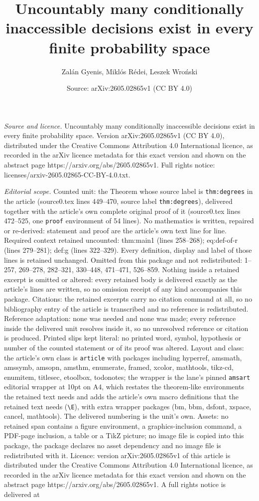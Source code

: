 \documentclass[10pt,a4paper]{amsart}
\title[Uncountably many conditionally inaccessible decisions exist ]{Uncountably many conditionally inaccessible decisions exist in every finite probability space}
\author{Zal\'an Gyenis, Mikl\'os R\'edei, Leszek Wro\'nski}
\date{Source: arXiv:2605.02865v1 (CC BY 4.0)}
\begin{document}
\maketitle

\noindent\emph{Source and licence.} Uncountably many conditionally inaccessible decisions exist in every finite probability space. Version arXiv:2605.02865v1 (CC BY 4.0), distributed under the Creative Commons Attribution 4.0 International licence, as recorded in the arXiv licence metadata for this exact version and shown on the abstract page https://arxiv.org/abs/2605.02865v1. Full rights notice: licenses/arxiv-2605.02865-CC-BY-4.0.txt.\par\smallskip

\noindent\textit{Editorial scope.} Counted unit: the Theorem whose source label is \texttt{thm:degrees} in the article (source0.tex lines 449--470, source label \texttt{thm:degrees}), delivered together with the article's own complete original proof of it (source0.tex lines 472--525, one \texttt{proof} environment of 54 lines). No mathematics is written, repaired or re-derived: statement and proof are the article's own text line for line. Required context retained uncounted: thm:main1 (lines 258--268); eq:def-of-r (lines 279--281); def:g (lines 322--329). Every definition, display and label of those lines is retained unchanged. Omitted from this package and not redistributed: 1--257, 269--278, 282--321, 330--448, 471--471, 526--859. Nothing inside a retained excerpt is omitted or altered: every retained body is delivered exactly as the article's lines are written, so no omission receipt of any kind accompanies this package. Citations: the retained excerpts carry no citation command at all, so no bibliography entry of the article is transcribed and no reference is redistributed. Reference adaptation: none was needed and none was made; every reference inside the delivered unit resolves inside it, so no unresolved reference or citation is produced. Printed slips kept literal: no printed word, symbol, hypothesis or number of the counted statement or of its proof was altered. Layout and class: the article's own class is \texttt{article} with packages including hyperref, amsmath, amssymb, amsopn, amsthm, enumerate, framed, xcolor, mathtools, tikz-cd, enumitem, titlesec, etoolbox, todonotes; the wrapper is the lane's pinned \texttt{amsart} editorial wrapper at 10pt on A4, which restates the theorem-like environments the retained text needs and adds the article's own macro definitions that the retained text needs (\texttt{\textbackslash E}), with extra wrapper packages (bm, bbm, dsfont, xspace, cancel, mathtools). The delivered numbering is the unit's own. Assets: no retained span contains a figure environment, a graphics-inclusion command, a PDF-page inclusion, a table or a TikZ picture; no image file is copied into this package, the package declares no asset dependency and no image file is redistributed with it. Licence: version arXiv:2605.02865v1 of this article is distributed under the Creative Commons Attribution 4.0 International licence, as recorded in the arXiv licence metadata for this exact version and shown on the abstract page https://arxiv.org/abs/2605.02865v1. A full rights notice is delivered at 
\end{document}
